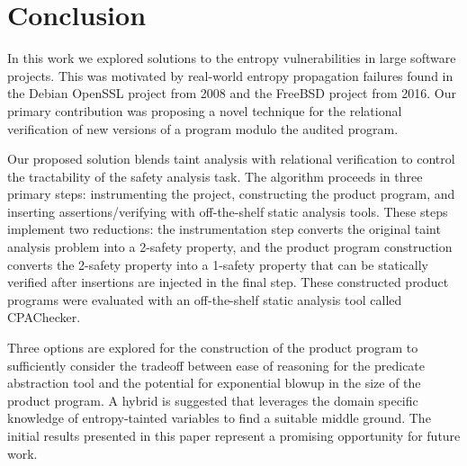 \documentclass[letterpaper,twocolumn,10pt]{article}
\begin{document}
\section{Conclusion}

In this work we explored solutions to the entropy vulnerabilities in large software projects. This was motivated by real-world entropy propagation failures found in the Debian OpenSSL project from 2008 and the FreeBSD project from 2016. Our primary contribution was proposing a novel technique for the relational verification of new versions of a program modulo the audited program. 

Our proposed solution blends taint analysis with relational verification to control the tractability of the safety analysis task. The algorithm proceeds in three primary steps: instrumenting the project, constructing the product program, and inserting assertions/verifying with off-the-shelf static analysis tools. These steps implement two reductions: the instrumentation step converts the original taint analysis problem into a 2-safety property, and the product program construction converts the 2-safety property into a 1-safety property that can be statically verified after insertions are injected in the final step. These constructed product programs were evaluated with an off-the-shelf static analysis tool called CPAChecker.

Three options are explored for the construction of the product program to sufficiently consider the tradeoff between ease of reasoning for the predicate abstraction tool and the potential for exponential blowup in the size of the product program. A hybrid is suggested that leverages the domain specific knowledge of entropy-tainted variables to find a suitable middle ground. The initial results presented in this paper represent a promising opportunity for future work.  

{\normalsize 
}

\end{document}
